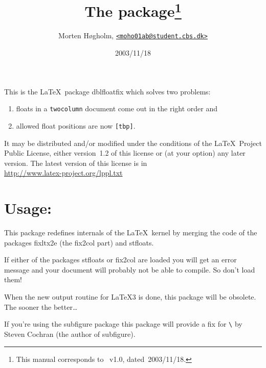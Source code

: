 \documentclass[DIV=8, pagesize=auto]{scrartcl}
\title{The \pkg{dblfloatfix} package\thanks{This manual corresponds to \pkg{dblfloatfix}~v1.0, dated~2003/11/18.}}
\author{Morten Høgholm, \href{mailto:moho01ab@student.cbs.dk}{\texttt{<moho01ab@student.cbs.dk>}}}
\date{2003/11/18}
\makeatletter
\newcommand*{\pkg}[1]{\textsf{#1}}
\newcommand*{\cs}[1]{\texttt{\textbackslash#1}}
\newcommand*{\cmd}[1]{\cs{\expandafter\@gobble\string#1}}
\newcommand*{\opt}[1]{\texttt{#1}}
\makeatother
\begin{document}
\maketitle

\noindent
This is the \LaTeX\ package \pkg{dblfloatfix} which solves two problems:
%
\renewcommand*{\theenumi}{\alph{enumi}}%
\renewcommand*{\labelenumi}{\theenumi)}%
\begin{enumerate}
\item floats in a \opt{twocolumn} document come out in the right order and
\item allowed float positions are now \texttt{[tbp]}.
\end{enumerate}
%
It may be distributed and/or modified under the
conditions of the \LaTeX\ Project Public License, either version~1.2
of this license or (at your option) any later version.
The latest version of this license is in\\
\url{http://www.latex-project.org/lppl.txt}


\section*{Usage:}

This package redefines internals of the \LaTeX\ kernel by merging
the code of the packages \pkg{fixltx2e} (the \pkg{fix2col} part) and \pkg{stfloats}.

If either of the packages \pkg{stfloats} or \pkg{fix2col} are loaded you will
get an error message and your document will probably not be able
to compile. So don't load them!

When the new output routine for \LaTeX3 is done, this package will
be obsolete. The sooner the better\ldots

If you're using the \pkg{subfigure} package this package will provide a
fix for \cmd{\end@dblfloat} by Steven Cochran (the author of \pkg{subfigure}).
\end{document}
